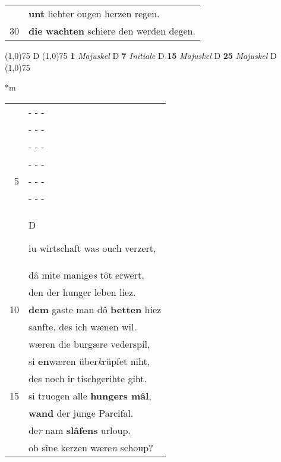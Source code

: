 \documentclass[8pt,a4paper,notitlepage]{article}
\begin{document}
\begin{table}[ht]
\begin{minipage}[t]{0.5\linewidth}
\begin{tabular}{rl}
 & \textbf{unt} liehter ougen herzen regen.\\ 
30 & \textbf{die} \textbf{wachten} schiere den werden degen.\\ 
\end{tabular}
\scriptsize
\line(1,0){75} \newline
D \newline
\line(1,0){75} \newline
\textbf{1} \textit{Majuskel} D  \textbf{7} \textit{Initiale} D  \textbf{15} \textit{Majuskel} D  \textbf{25} \textit{Majuskel} D  \newline
\line(1,0){75} \newline
\newline
\end{minipage}
\hspace{0.5cm}
\begin{minipage}[t]{0.5\linewidth}
\small
\begin{center}*m
\end{center}
\begin{tabular}{rl}
 & \multicolumn{1}{l}{ - - - }\\ 
 & \multicolumn{1}{l}{ - - - }\\ 
 & \multicolumn{1}{l}{ - - - }\\ 
 & \multicolumn{1}{l}{ - - - }\\ 
5 & \multicolumn{1}{l}{ - - - }\\ 
 & \multicolumn{1}{l}{ - - - }\\ 
 & \begin{large}D\end{large}iu wirtschaft was ouch verzert,\\ 
 & dâ mite manige\textit{s} tôt erwert,\\ 
 & den der hunger leben liez.\\ 
10 & \textbf{dem} gaste man dô \textbf{betten} hiez\\ 
 & sanfte, des ich wænen wil.\\ 
 & wæren die burgære vederspil,\\ 
 & si \textbf{en}wæren über\textit{k}rüpfet niht,\\ 
 & des noch ir tischgerihte giht.\\ 
15 & si truogen alle \textbf{hungers mâl},\\ 
 & \textbf{wand} der junge Parcifal.\\ 
 & de\textit{r} nam \textbf{slâfens} urloup.\\ 
 & ob sîne kerzen wære\textit{n} schoup?\\ 

\end{tabular}
\end{minipage}
\end{table}
\end{document}
